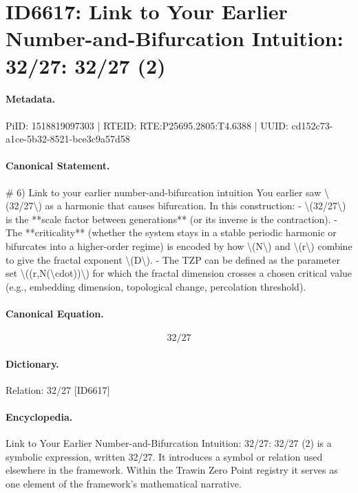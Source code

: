 \section*{ID6617: Link to Your Earlier Number-and-Bifurcation Intuition: 32/27: 32/27 (2)}
\paragraph{Metadata.}
PiID: 1518819097303 | RTEID: RTE:P25695.2805:T4.6388 | UUID: cd152c73-a1ce-5b32-8521-bce3c9a57d58

\paragraph{Canonical Statement.}
\# 6) Link to your earlier number-and-bifurcation intuition You earlier saw \textbackslash{}(32/27\textbackslash{}) as a harmonic that causes bifurcation. In this construction: - \textbackslash{}(32/27\textbackslash{}) is the **scale factor between generations** (or its inverse is the contraction). - The **criticality** (whether the system stays in a stable periodic harmonic or bifurcates into a higher-order regime) is encoded by how \textbackslash{}(N\textbackslash{}) and \textbackslash{}(r\textbackslash{}) combine to give the fractal exponent \textbackslash{}(D\textbackslash{}). - The TZP can be defined as the parameter set \textbackslash{}((r,N(\textbackslash{}cdot))\textbackslash{}) for which the fractal dimension crosses a chosen critical value (e.g., embedding dimension, topological change, percolation threshold).

\paragraph{Canonical Equation.}
\[
32/27
\]

\paragraph{Dictionary.}
Relation: 32/27 [ID6617]

\paragraph{Encyclopedia.}
Link to Your Earlier Number-and-Bifurcation Intuition: 32/27: 32/27 (2) is a symbolic expression, written 32/27. It introduces a symbol or relation used elsewhere in the framework. Within the Trawin Zero Point registry it serves as one element of the framework's mathematical narrative.
